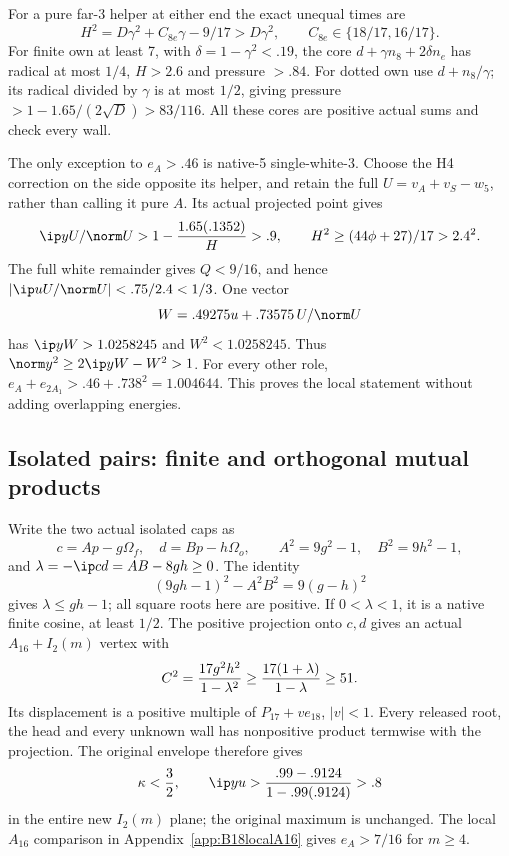 For a pure far-3 helper at either end the exact unequal times are
\[
 H^2=D\gamma^2+C_{8e}\gamma-9/17>D\gamma^2,\qquad
 C_{8e}\in\{18/17,16/17\}.
\]
For finite own at least 7, with \(\delta=1-\gamma^2<.19\),
the core \(d+\gamma n_8+2\delta n_e\) has radical at most \(1/4\),
\(H>2.6\) and pressure \(>.84\).
For dotted own use \(d+n_8/\gamma\); its radical divided by
\(\gamma\) is at most \(1/2\), giving pressure
\(>1-1.65/(2\sqrt D)>83/116\).
All these cores are positive actual sums and check every wall.

The only exception to \(e_A>.46\) is native-5 single-white-3.
Choose the H4 correction on the side opposite its helper, and retain
the full \(U=v_A+v_S-w_5\), rather than calling it pure \(A\).
Its actual projected point gives
\[
 \ip y{U/\norm U}>
 1-{1.65(.1352)\over H}>.9,
 \qquad H^2\ge(44\phi+27)/17>2.4^2 .
\]
The full white remainder gives \(Q<9/16\), and hence
\(\lvert\ip u{U/\norm U}\rvert<.75/2.4<1/3\).
One vector
\[
 W=.49275u+.73575\,U/\norm U
\]
has \(\ip yW>1.0258245\) and \(W^2<1.0258245\).
Thus \(\norm y^2\ge2\ip yW-W^2>1\).
For every other role,
\(e_A+e_{2A_1}>.46+.738^2=1.004644\).
This proves the local statement without adding overlapping energies.

\subsection{Isolated pairs: finite and orthogonal mutual products}
\label{app:D18isolatedfinite}

Write the two actual isolated caps as
\[
 c=Ap-g\Omega_f,\quad d=Bp-h\Omega_o,\qquad
 A^2=9g^2-1,\quad B^2=9h^2-1,
\]
and \(\lambda=-\ip cd=AB-8gh\ge0\).
The identity
\[
 (9gh-1)^2-A^2B^2=9(g-h)^2
\]
gives \(\lambda\le gh-1\); all square roots here are positive.
If \(0<\lambda<1\), it is a native finite cosine, at least \(1/2\).
The positive projection onto \(c,d\) gives an actual
\(A_{16}+I_2(m)\) vertex with
\[
 C^2={17g^2h^2\over1-\lambda^2}
 \ge {17(1+\lambda)\over1-\lambda}\ge51.
\]
Its displacement is a positive multiple of
\(P_{17}+ve_{18}\), \(|v|<1\).
Every released root, the head and every unknown wall has
nonpositive product termwise with the projection.
The original envelope therefore gives
\[
 \kappa<{3\over2},\qquad
 \ip yu>{.99-.9124\over1-.99(.9124)}>.8
\]
in the entire new \(I_2(m)\) plane; the original maximum is
unchanged.  The local \(A_{16}\) comparison in
Appendix~\ref{app:B18localA16} gives \(e_A>7/16\) for \(m\ge4\).


